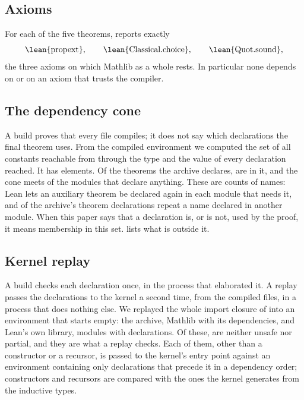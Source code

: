 \subsection{Axioms}
For each of the five theorems,  reports exactly
\[
\text{\lean{propext}},\qquad \text{\lean{Classical.choice}},\qquad \text{\lean{Quot.sound}},
\]
the three axioms on which Mathlib as a whole rests. In particular none depends on
 or on an axiom that trusts the compiler.

\subsection{The dependency cone}\label{sec:cone}
A build proves that every file compiles; it does not say which declarations the final theorem
uses. From the compiled environment we computed the set of all constants reachable from
 through the type and the value of every declaration reached. It has
\conesize{} elements. Of the \projtheorems{} theorems the archive declares,
\coneprojtheorems{} are in it, and the cone meets \coneprojmodules{} of the \projmodules{}
modules that declare anything. These are counts of names: Lean lets an auxiliary theorem be
declared again in each module that needs it, and \repeatedtheorems{} of the archive's theorem
declarations repeat a name declared in another module. When this paper says that a declaration
is, or is not, used by the proof, it means membership in this set.  lists
what is outside it.

\subsection{Kernel replay}
A build checks each declaration once, in the process that elaborated it. A replay passes the
declarations to the kernel a second time, from the compiled files, in a process that does
nothing else. We replayed the whole import closure of  into an environment that
starts empty: the archive, Mathlib with its dependencies, and Lean's own library,
\replaymodules{} modules with \replayconstants{} declarations. Of these, \replaydecls{} are
neither unsafe nor partial, and they are what a replay checks. Each of them, other than a
constructor or a recursor, is passed to the kernel's entry point
 against an environment containing only declarations that
precede it in a dependency order; constructors and recursors are compared with the ones the
kernel generates from the inductive types.

